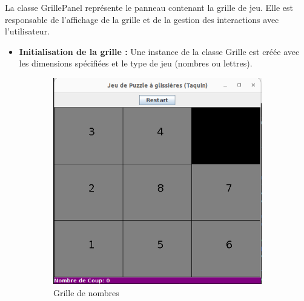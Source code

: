 \documentclass[a4paper,10pt]{article}
\begin{document}
La classe GrillePanel représente le panneau contenant la grille de jeu. Elle est responsable de l'affichage de la grille et de la gestion des interactions avec l'utilisateur.

\begin{itemize}
\item \textbf{Initialisation de la grille :} Une instance de la classe Grille est créée avec les dimensions spécifiées et le type de jeu (nombres ou lettres).
\end{itemize}


\begin{figure}[H]
\centering
\begin{subfigure}{0.45\textwidth}
  \centering
  \includegraphics[width=\linewidth]{captures/nombres.png}
  \caption{Grille de nombres}
\end{subfigure}
\hfill
\begin{subfigure}{0.45\textwidth}
  \centering

\end{subfigure}
\end{figure}
\end{document}
